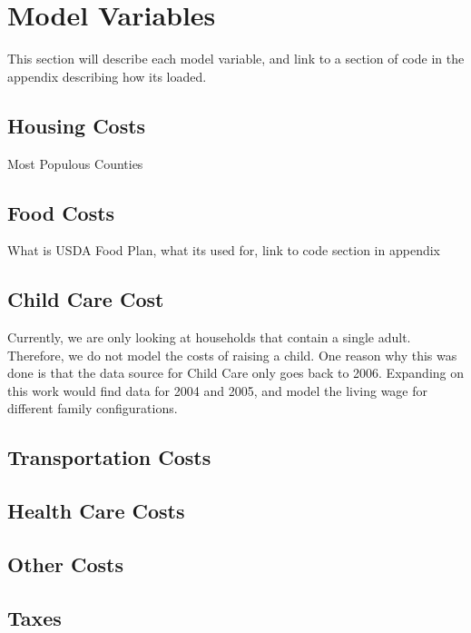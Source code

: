 \chapter{Model Variables}\label{ch:model_variables}


This section will describe each model variable, and link to a section of code in the appendix describing how its loaded.

\section{Housing Costs}

Most Populous Counties

\section{Food Costs}

What is USDA Food Plan, what its used for, link to code section in appendix

\section{Child Care Cost}

Currently, we are only looking at households that contain a single adult. Therefore, we do not model the costs of raising a child. One reason why this was done is that the data source for Child Care only goes back to 2006. Expanding on this work would find data for 2004 and 2005, and model the living wage for different family configurations.

\section{Transportation Costs}

\section{Health Care Costs}

\section{Other Costs}

\section{Taxes}


